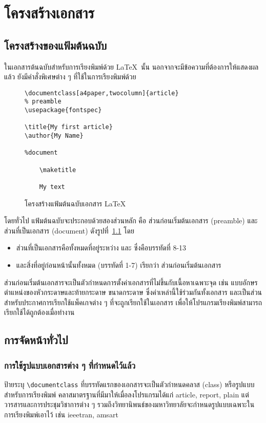 \chapter{โครงสร้างเอกสาร}
\label{chapter:DocumentStructure}

\section{โครงสร้างของแฟ้มต้นฉบับ}
ในเอกสารต้นฉบับสำหรับการเรียงพิมพ์ด้วย \LaTeX~นั้น นอกจากจะมีข้อความที่ต้องการให้แสดงผลแล้ว ยังมีคำสั่งพิเศษต่าง ๆ ที่ใช้ในการเรียงพิมพ์ด้วย
\begin{figure}[h]
\begin{lstlisting}
\documentclass[a4paper,twocolumn]{article}
% preamble
\usepackage{fontspec}

\title{My first article}
\author{My Name}

%document

	\maketitle
	
	My text

\end{lstlisting}
	\caption{โครงสร้างแฟ้มต้นฉบับเอกสาร \LaTeX}
	\label{Fig:Structure}
\end{figure}

โดยทั่วไป แฟ้มต้นฉบับจะประกอบด้วยสองส่วนหลัก คือ ส่วนก่อนเริ่มต้นเอกสาร (preamble) และส่วนที่เป็นเอกสาร (document) ดังรูปที่~\ref{Fig:Structure}
โดย
\begin{itemize}
	\item ส่วนที่เป็นเอกสารคือทั้งหมดที่อยู่ระหว่าง \lstinline|| และ \lstinline|| ซึ่งคือบรรทัดที่ 8-13
	\item และสิ่งที่อยู่ก่อนหน้านั้นทั้งหมด (บรรทัดที่ 1-7) เรียกว่า ส่วนก่อนเริ่มต้นเอกสาร
\end{itemize}

ส่วนก่อนเริ่มต้นเอกสารจะเป็นตัวกำหนดการตั้งค่าเอกสารที่ไม่ขึ้นกับเนื้อหาเฉพาะจุด เช่น แบบอักษร ตำแหน่งของหัวกระดาษและท้ายกระดาษ ขนาดกระดาษ ซึ่งค่าเหล่านี้ใช้ร่วมกันทั้งเอกสาร
และเป็นส่วนสำหรับประกาศการเรียกใช้แพ็คเกจต่าง ๆ ที่จะถูกเรียกใช้ในเอกสาร เพื่อให้โปรแกรมเรียงพิมพ์สามารถเรียกใช้ได้ถูกต้องเมื่อทำงาน

\section{การจัดหน้าทั่วไป}
\subsection{การใช้รูปแบบเอกสารต่าง ๆ ที่กำหนดไว้แล้ว}
ป้ายระบุ \lstinline|\documentclass| ที่บรรทัดแรกของเอกสารจะเป็นตัวกำหนดคลาส (class) หรือรูปแบบสำหรับการเรียงพิมพ์
คลาสมาตรฐานที่มีมาให้เมื่อลงโปรแกรมได้แก่ article, report, plain
แต่วารสารและการประชุมวิชาการต่าง ๆ รวมถึงวิทยานิพนธ์ของมหาวิทยาลัยจะกำหนดรูปแบบเฉพาะในการเรียงพิมพ์เอาไว้ เช่น ieeetran, amsart

